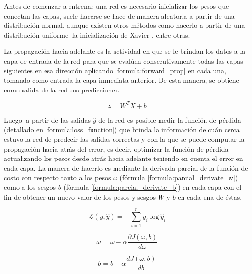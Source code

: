  Antes de comenzar a entrenar una red es necesario inicializar los pesos que conectan las capas, suele hacerse se hace de manera aleatoria a partir de una distribución normal, aunque existen otros métodos como hacerlo a partir de una distribución uniforme, la inicialización de Xavier \cite{glorot2010understanding}, entre otras.
 
 La propagación hacia adelante es la actividad en que se le brindan los datos a la capa de entrada de la red para que se evalúen consecutivamente todas las capas siguientes en esa dirección aplicando \ref{formula:forward_prop} en cada una, tomando como entrada la capa inmediata anterior. De esta manera, se obtiene como salida de la red sus predicciones. 
 
 \begin{equation}\label{formula:forward_prop}
 z=W^{T} X+b
 \end{equation}
 
 Luego, a partir de las salidas \(\hat{y}\) de la red es posible medir la función de pérdida (detallado en \ref{formula:loss_function}) que brinda la información de cuán cerca estuvo la red de predecir las salidas correctas y con la que se puede computar la propagación hacia atrás del error, es decir, optimizar la función de pérdida actualizando los pesos desde atrás hacia adelante teniendo en cuenta el error en cada capa. La manera de hacerlo es mediante la derivada parcial de la función de costo con respecto tanto a los pesos \(\omega\) (fórmula \ref{formula:parcial_derivate_w}) como a los sesgos \(b\) (fórmula \ref{formula:parcial_derivate_b}) en cada capa con el fin de obtener un nuevo valor de los pesos y sesgos \(W\) y \(b\) en cada una de éstas.
  
 \begin{equation}\label{formula:loss_function}
 \mathcal{L}(y, \hat{y})=-\sum_{i=1}^{n} y_{i} \log \hat{y}_{i}
 \end{equation}
 
 \begin{equation}\label{formula:parcial_derivate_w}
 \omega =\omega-\alpha \frac{\partial J(\omega, b)}{d \omega}
 \end{equation}
 
 \begin{equation}\label{formula:parcial_derivate_b}
 b=b-\alpha \frac{d J(\omega, b)}{d b}
 \end{equation}
 
